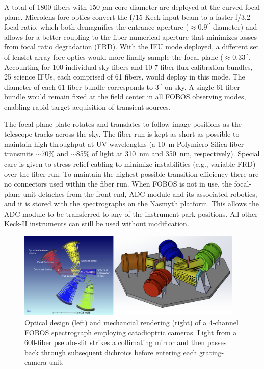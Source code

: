 A total of 1800 fibers with 150-$\mu$m core diameter are deployed at the curved focal plane. Microlens fore-optics
convert the f/15 Keck input beam to a faster f/3.2 focal ratio, which both demagnifies the entrance aperture
($\approx$0.9$^{\prime\prime}$ diameter) and allows for a better coupling to the fiber numerical aperture that
minimizes losses from focal ratio degradation (FRD).  With the IFU mode deployed, a different set of lenslet array
fore-optics would more finally sample the focal plane ($\approx$0.33$^{\prime\prime}$.  Accounting for 100 individual
sky fibers and 10 7-fiber flux calibration bundles, 25 science IFUs, each comprised of 61 fibers, would deploy in this
mode.  The diameter of each 61-fiber bundle corresponds to 3$^{\prime\prime}$ on-sky.  A single 61-fiber bundle would remain fixed at the field center in all FOBOS observing modes, enabling rapid target acquisition of transient sources.

The focal-plane plate rotates and translates to follow image
positions as the telescope tracks across the sky. The fiber run is
kept as short as possible to maintain high throughput at UV
wavelengths (a 10~m Polymicro Silica fiber transmits $\sim$70\% and
$\sim$85\% of light at 310~nm and 350~nm, respectively). Special care
is given to stress-relief cabling to minimize instabilities (e.g.,
variable FRD) over the fiber run. To maintain the highest possible
transition efficiency there are no connectors used within the fiber
run. When FOBOS is not in use, the focal-plane unit detaches from the
front-end, ADC module and its associated robotics, and it is stored
with the spectrographs on the Nasmyth platform. This allows the ADC
module to be transferred to any of the instrument park positions. All
other Keck-II instruments can still be used without modification.

\begin{figure}[h!]
\vskip -0.1in
\includegraphics[width=0.96\textwidth]{figs/FOBOS_spec_optical-CAD.png}
\caption{\small Optical design (left) and mechancial rendering (right) of a 4-channel FOBOS spectrograph employing catadioptric cameras.
Light from a 600-fiber pseudo-slit strikes a collimating mirror and then
passes back through subsequent dichroics before entering each grating-camera unit.}
\label{fig:spectrograph}
\end{figure}

